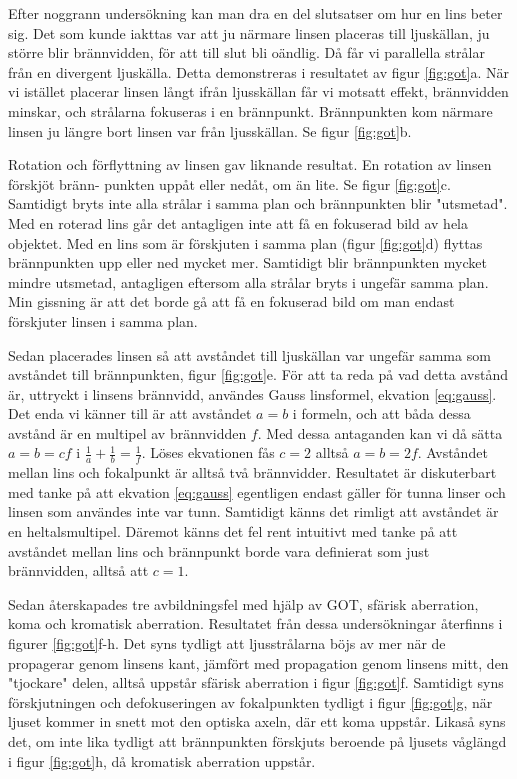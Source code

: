 \documentclass[a4paper]{article}
\begin{document}
Efter noggrann undersökning kan man dra en del slutsatser om hur en lins beter sig. Det som kunde iakttas var att
ju närmare linsen placeras till ljuskällan, ju större blir brännvidden, för att till slut bli oändlig. Då får vi
parallella strålar från en divergent ljuskälla. Detta demonstreras i resultatet av figur \ref{fig:got}a. 
När vi istället placerar linsen långt ifrån ljusskällan får vi motsatt effekt, brännvidden minskar, och strålarna
fokuseras i en brännpunkt. Brännpunkten kom närmare linsen ju längre bort linsen var från ljusskällan. Se figur \ref{fig:got}b.

Rotation och förflyttning av linsen gav liknande resultat. En rotation av linsen förskjöt bränn-
punkten uppåt eller nedåt, om än lite. Se figur \ref{fig:got}c. Samtidigt bryts inte alla strålar i samma plan och brännpunkten
blir "utsmetad". Med en roterad lins går det antagligen inte att få en fokuserad bild av hela objektet. Med en lins
som är förskjuten i samma plan (figur \ref{fig:got}d) flyttas brännpunkten upp eller ned mycket mer. Samtidigt blir
brännpunkten mycket mindre utsmetad, antagligen eftersom alla strålar bryts i ungefär samma plan. Min gissning är att
det borde gå att få en fokuserad bild om man endast förskjuter linsen i samma plan.

Sedan placerades linsen så att avståndet till ljuskällan var ungefär samma som avståndet till brännpunkten, figur \ref{fig:got}e.
För att ta reda på vad detta avstånd är, uttryckt i linsens brännvidd, användes Gauss linsformel, ekvation \ref{eq:gauss}. Det enda vi
känner till är att avståndet $a = b$ i formeln, och att båda dessa avstånd är en multipel av brännvidden $f$. Med dessa antaganden
kan vi då sätta $a = b = cf$ i $ \frac{1}{a} + \frac{1}{b} = \frac{1}{f}$. Löses ekvationen fås $c=2$ alltså $a=b=2f$. Avståndet mellan
lins och fokalpunkt är alltså två brännvidder. Resultatet är diskuterbart med tanke på att ekvation \ref{eq:gauss} egentligen endast gäller
för tunna linser och linsen som användes inte var tunn. Samtidigt känns det rimligt att avståndet är en heltalsmultipel. Däremot känns det
fel rent intuitivt med tanke på att avståndet mellan lins och brännpunkt borde vara definierat som just brännvidden, alltså att $c = 1$.

Sedan återskapades tre avbildningsfel med hjälp av GOT, sfärisk aberration, koma och kromatisk aberration. Resultatet från dessa undersökningar
återfinns i figurer \ref{fig:got}f-h. Det syns tydligt att ljusstrålarna böjs av mer när de propagerar genom linsens kant, jämfört med propagation
genom linsens mitt, den "tjockare" delen, alltså uppstår sfärisk aberration i figur \ref{fig:got}f. Samtidigt syns förskjutningen och defokuseringen
av fokalpunkten tydligt i figur \ref{fig:got}g, när ljuset kommer in snett mot den optiska axeln, där ett koma uppstår. Likaså syns det, om inte lika 
tydligt att brännpunkten förskjuts beroende på ljusets våglängd i figur \ref{fig:got}h, då kromatisk aberration uppstår.
\end{document}
